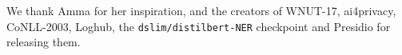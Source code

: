 We thank Amma for her inspiration, and the creators of WNUT-17, ai4privacy, CoNLL-2003, Loghub, the \texttt{dslim/distilbert-NER} checkpoint and Presidio for releasing them.
